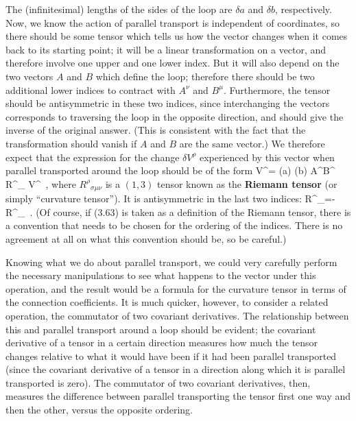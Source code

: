 \begin{figure}[h]
  \centerline{
  }
\end{figure}

\noindent The (infinitesimal) lengths of the sides of the loop are $\delta 
a$ and $\delta b$, respectively.  Now, we know the action of parallel
transport is independent of coordinates, so there should be some
tensor which tells us how the vector changes when it comes back to 
its starting point; it will be a linear transformation on a vector,
and therefore involve one upper and one lower index.  But it will
also depend on the two vectors $A$ and $B$ which define the loop;
therefore there should be two additional lower indices to contract with
$A^\nu$ and $B^\mu$.  Furthermore, the tensor should be antisymmetric
in these two indices, since interchanging the vectors corresponds to
traversing the loop in the opposite direction, and should give the
inverse of the original answer.  (This is consistent with the
fact that the transformation should vanish if $A$ and $B$
are the same vector.)  We therefore expect that the expression for
the change $\delta V^\rho$ experienced by this vector when parallel
transported around the loop should be of the form
\be
  \delta V^\rho = (\delta a) (\delta b) A^\nu B^\mu
  R^\rho{}_{\sigma \mu\nu} V^\sigma\ ,\label{3.63}
\ee
where $R^\rho{}_{\sigma \mu\nu}$ is a $(1,3)$ tensor known as the
{\bf Riemann tensor} (or simply ``curvature tensor'').  It is
antisymmetric in the last two indices:
\be
  R^\rho{}_{\sigma \mu\nu}=-R^\rho{}_{\sigma \nu\mu}\ .\label{3.64}
\ee
(Of course, if (3.63) is taken as a definition of the Riemann tensor,
there is a convention that needs to be chosen for the ordering of
the indices.  There is no agreement at all on what this convention
should be, so be careful.)

Knowing what we do about parallel transport, we could very carefully
perform the necessary manipulations to see what happens to the
vector under this operation, and the result would be a formula for 
the curvature tensor in terms of the connection coefficients.  It is
much quicker, however, to consider a related operation, the 
commutator of two covariant derivatives.  The relationship between
this and parallel transport around a loop should be evident; the
covariant derivative of a tensor in a certain direction measures
how much the tensor changes relative to what it would have been if
it had been parallel transported (since the covariant derivative of
a tensor in a direction along which it is parallel transported is
zero).  The commutator of two covariant derivatives, then, measures
the difference between parallel transporting the tensor first one
way and then the other, versus the opposite ordering.

